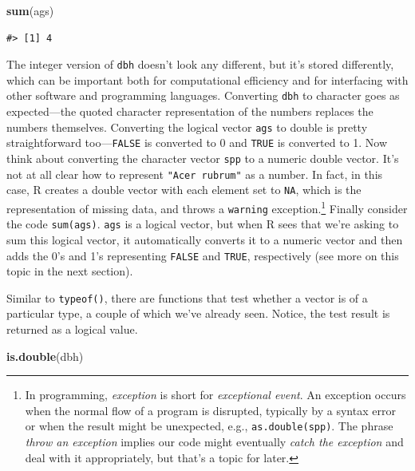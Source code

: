 \documentclass[
  11pt,
]{krantz}
\newenvironment{Shaded}{\begin{snugshade}}{\end{snugshade}}
\newcommand{\KeywordTok}[1]{\textcolor[rgb]{0.13,0.29,0.53}{\textbf{#1}}}
\newcommand{\NormalTok}[1]{#1}
\theoremstyle{definition}
\theoremstyle{definition}
\theoremstyle{definition}
\theoremstyle{definition}
\theoremstyle{remark}
\begin{document}
\begin{Shaded}
\begin{Highlighting}[]
\KeywordTok{sum}\NormalTok{(ags)}
\end{Highlighting}
\end{Shaded}

\begin{verbatim}
#> [1] 4
\end{verbatim}

The integer version of \texttt{dbh} doesn't look any different, but it's stored differently, which can be important both for computational efficiency and for interfacing with other software and programming languages. Converting \texttt{dbh} to character goes as expected---the quoted character representation of the numbers replaces the numbers themselves. Converting the logical vector \texttt{ags} to double is pretty straightforward too---\texttt{FALSE} is converted to 0 and \texttt{TRUE} is converted to 1. Now think about converting the character vector \texttt{spp} to a numeric double vector. It's not at all clear how to represent \texttt{"Acer\ rubrum"} as a number. In fact, in this case, R creates a double vector with each element set to \texttt{NA}, which is the representation of missing data, and throws a \texttt{warning} exception.\footnote{In programming, \emph{exception} is short for \emph{exceptional event}. An exception occurs when the normal flow of a program is disrupted, typically by a syntax error or when the result might be unexpected, e.g., \texttt{as.double(spp)}. The phrase \emph{throw an exception} implies our code might eventually \emph{catch the exception} and deal with it appropriately, but that's a topic for later.} Finally consider the code \texttt{sum(ags)}. \texttt{ags} is a logical vector, but when R sees that we're asking to sum this logical vector, it automatically converts it to a numeric vector and then adds the 0's and 1's representing \texttt{FALSE} and \texttt{TRUE}, respectively (see more on this topic in the next section).

Similar to \texttt{typeof()}, there are functions that test whether a vector is of a particular type, a couple of which we've already seen. Notice, the test result is returned as a logical value.

\begin{Shaded}
\begin{Highlighting}[]
\KeywordTok{is.double}\NormalTok{(dbh)}
\end{Highlighting}
\end{Shaded}
\end{document}
